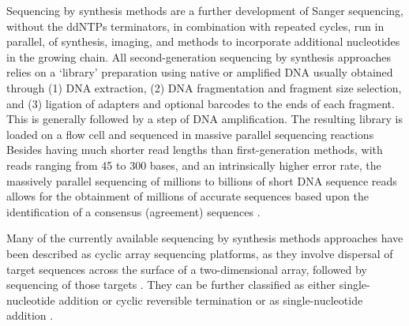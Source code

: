 Sequencing by synthesis methods are a further development of Sanger sequencing, without the ddNTPs terminators, in combination with repeated cycles, run in parallel, of synthesis, imaging, and methods to incorporate additional nucleotides in the growing chain. 
All second-generation sequencing by synthesis approaches relies on a ‘library’ preparation using native or amplified DNA usually obtained through (1) DNA extraction, (2) DNA fragmentation and fragment size selection, and (3) ligation of adapters and optional barcodes to the ends of each fragment. 
This is generally followed by a step of DNA amplification. The resulting library is loaded on a flow cell and sequenced in massive parallel sequencing reactions \citep{giani_long_2020}
Besides having much shorter read lengths than first-generation methods, with reads ranging from 45 to 300 bases, and an intrinsically higher error rate, the massively parallel sequencing of millions to billions of short DNA sequence reads allows for the obtainment of millions of accurate sequences based upon the identification of a consensus (agreement) sequences \citep{slatko_overview_2018, goodwin_coming_2016, hagemann_overview_2015}. 

Many of the currently available sequencing by synthesis methods approaches have been described as cyclic array sequencing platforms, as they involve dispersal of target sequences across the surface of a two-dimensional array, followed by sequencing of those targets \citep{hagemann_overview_2015}. 
They can be further classified as either single-nucleotide addition or cyclic reversible termination or as single-nucleotide addition \citep{goodwin_coming_2016}. 

